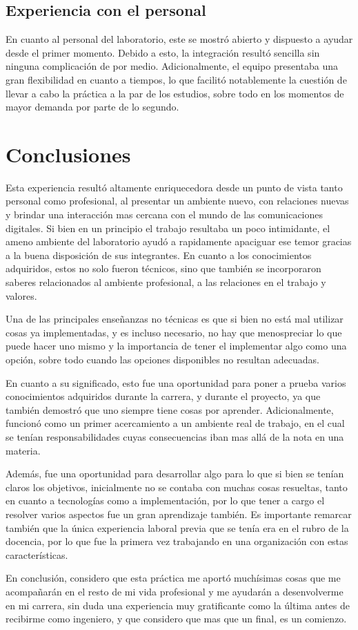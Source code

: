 \documentclass[a4paper,10pt]{article}
\begin{document}
\subsection{Experiencia con el personal}
En cuanto al personal del laboratorio, este se mostró abierto y dispuesto a ayudar desde el primer momento. Debido a esto, la integración resultó sencilla sin ninguna complicación de por medio. Adicionalmente, el equipo presentaba una gran flexibilidad en cuanto a tiempos,
lo que facilitó notablemente la cuestión de llevar a cabo la práctica a la par de los estudios, sobre todo en los momentos de mayor demanda por parte de lo segundo.

\section{Conclusiones}
Esta experiencia resultó altamente enriquecedora desde un punto de vista tanto personal como profesional, al presentar un ambiente nuevo, con relaciones nuevas y brindar una interacción mas cercana con el mundo de las comunicaciones digitales. 
Si bien en un principio el trabajo resultaba un poco intimidante, el ameno ambiente del laboratorio ayudó a rapidamente apaciguar ese temor gracias a la buena disposición de sus integrantes. En cuanto a los conocimientos adquiridos, estos no solo fueron técnicos, sino que 
también se incorporaron saberes relacionados al ambiente profesional, a las relaciones en el trabajo y valores. 
\par
Una de las principales enseñanzas no técnicas es que si bien no está mal utilizar cosas ya implementadas, y es incluso necesario, no hay que menospreciar lo que
puede hacer uno mismo y la importancia de tener el implementar algo como una opción, sobre todo cuando las opciones disponibles no resultan adecuadas.
\par
En cuanto a su significado, esto fue una oportunidad para poner a prueba varios conocimientos adquiridos durante la carrera, y  durante el proyecto, ya que también demostró que uno siempre tiene cosas por aprender. Adicionalmente, funcionó como un primer 
acercamiento a un ambiente real de trabajo, en el cual se tenían responsabilidades cuyas consecuencias iban mas allá de la nota en una materia. 
\par
Además, fue una oportunidad para desarrollar algo para lo que si bien se tenían claros los objetivos, inicialmente no se contaba con
muchas cosas resueltas, tanto en cuanto a tecnologías como a implementación, por lo que tener a cargo el resolver varios aspectos fue un gran aprendizaje también. Es importante remarcar también que la única experiencia laboral previa que se tenía era en el rubro de la docencia, por lo que fue la primera vez trabajando en una organización con estas características.
\par
En conclusión, considero que esta práctica me aportó muchísimas cosas que me acompañarán en el resto de mi vida profesional y me ayudarán a desenvolverme en mi carrera, sin duda una experiencia muy gratificante como la última antes de recibirme como ingeniero, y que 
considero que mas que un final, es un comienzo.
\end{document}
